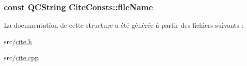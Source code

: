 \subsubsection[{file\+Name}]{\setlength{\rightskip}{0pt plus 5cm}const {\bf Q\+C\+String} Cite\+Consts\+::file\+Name\hspace{0.3cm}{\ttfamily [static]}}\label{struct_cite_consts_a76380abd8266f8b5e41511f70166f4dd}


La documentation de cette structure a été générée à partir des fichiers suivants \+:\begin{DoxyCompactItemize}
\item 
src/\hyperlink{cite_8h}{cite.\+h}\item 
src/\hyperlink{cite_8cpp}{cite.\+cpp}\end{DoxyCompactItemize}

